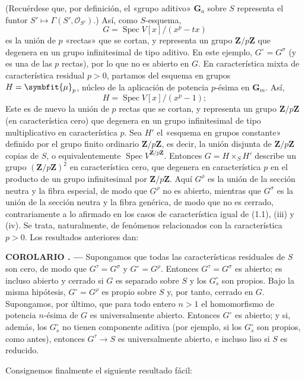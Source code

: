 \documentclass[11pt,twoside,openany]{book}
\numberwithin{equation}{section}
\newcommand{\src}[1]{%
  \phantomsection\hypertarget{src:#1}{}%
  \marginpar{\raggedleft\footnotesize\sffamily #1}%
}
\theoremstyle{plain}
\theoremstyle{definition}
\theoremstyle{remark}
\newcommand{\result}[2]{%
  \par\medskip\noindent\textbf{#1%
  \if\relax\detokenize{#2}\relax\else\space#2\fi. ---}\enspace
}
\newcommand{\FgaUnitKey}{frontmatter}
\renewcommand{\src}[1]{%
  \phantomsection\hypertarget{src:\FgaUnitKey:#1}{}%
  \marginpar{\raggedleft\footnotesize\sffamily #1}%
}
\renewcommand{\boldsymbol}[1]{\symbfit{#1}}
\theoremstyle{plain}
\theoremstyle{definition}
\theoremstyle{remark}
\begin{document}
\src{230}
(Recuérdese que, por definición, el «grupo aditivo» $\mathbf G_a$ sobre $S$
representa el funtor $S'\longmapsto\Gamma(S',\mathcal O_{S'})$.) Así, como
$S$-esquema,
\[
G=\operatorname{Spec}V[x]/(x^p-tx)
\]
es la unión de $p$ «rectas» que se cortan, y representa un grupo
$\mathbf Z/p\mathbf Z$ que degenera en un grupo infinitesimal de tipo aditivo.
En este ejemplo, $G^\circ=G^\sigma$ (y es una de las $p$ rectas), por lo que no
es abierto en $G$. En característica mixta de característica residual $p>0$,
partamos del esquema en grupos $H=\boldsymbol\mu_p$, núcleo de la aplicación de
potencia $p$-ésima en $\mathbf G_m$. Así,
\[
H=\operatorname{Spec}V[x]/(x^p-1);
\]
Este es de nuevo la unión de $p$ rectas que se cortan, y representa un grupo
$\mathbf Z/p\mathbf Z$ (en característica cero) que degenera en un grupo
infinitesimal de tipo multiplicativo en característica $p$. Sea $H'$ el
«esquema en grupos constante» definido por el grupo finito ordinario
$\mathbf Z/p\mathbf Z$, es decir, la unión disjunta de $\mathbf Z/p\mathbf Z$
copias de $S$, o equivalentemente
$\operatorname{Spec}V^{\mathbf Z/p\mathbf Z}$. Entonces $G=H\times_S H'$
describe un grupo $(\mathbf Z/p\mathbf Z)^2$ en característica cero, que
degenera en característica $p$ en el producto de un grupo infinitesimal por
$\mathbf Z/p\mathbf Z$. Aquí $G^\rho$ es la unión de la sección neutra y la
fibra especial, de modo que $G^\rho$ no es abierto, mientras que $G^\sigma$ es
la unión de la sección neutra y la fibra genérica, de modo que no es cerrado,
contrariamente a lo afirmado en los casos de característica igual de (1.1),
(iii) y (iv). Se trata, naturalmente, de fenómenos relacionados con la
característica $p>0$. Los resultados anteriores dan:

\result{COROLARIO}{1.10} Supongamos que todas las características residuales de
$S$ son cero, de modo que $G^\tau=G^\sigma$ y $G^\circ=G^\rho$. Entonces
$G^\tau=G^\sigma$ es abierto; es incluso abierto y cerrado si $G$ es separado
sobre $S$ y los $G_s^\circ$ son propios. Bajo la misma hipótesis,
$G^\circ=G^\rho$ es propio sobre $S$ y, por tanto, cerrado en $G$. Supongamos,
por último, que para todo entero $n>1$ el homomorfismo de potencia $n$-ésima de
$G$ es universalmente abierto. Entonces $G^\circ$ es abierto; y si, además,
los $G_s^\circ$ no tienen componente aditiva (por ejemplo, si los
$G_s^\circ$ son propios, como antes), entonces $G^\tau\longrightarrow S$ es
universalmente abierto, e incluso liso si $S$ es reducido.

Consignemos finalmente el siguiente resultado fácil:
\end{document}
